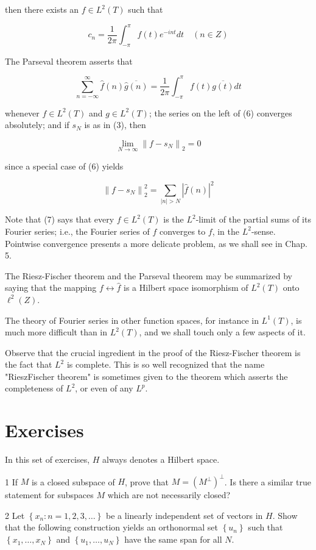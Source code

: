\documentclass[10pt]{article}
\begin{document}
then there exists an $f \in L^{2}(T)$ such that

$$
c_{n}=\frac{1}{2 \pi} \int_{-\pi}^{\pi} f(t) e^{-i n t} d t \quad(n \in Z)
$$

The Parseval theorem asserts that

$$
\sum_{n=-\infty}^{\infty} \hat{f}(n) \overline{\hat{g}(n)}=\frac{1}{2 \pi} \int_{-\pi}^{\pi} f(t) \overline{g(t)} d t
$$

whenever $f \in L^{2}(T)$ and $g \in L^{2}(T)$; the series on the left of (6) converges absolutely; and if $s_{N}$ is as in (3), then

$$
\lim _{N \rightarrow \infty}\left\|f-s_{N}\right\|_{2}=0
$$

since a special case of (6) yields

$$
\left\|f-s_{N}\right\|_{2}^{2}=\sum_{|n|>N}|\hat{f}(n)|^{2}
$$

Note that (7) says that every $f \in L^{2}(T)$ is the $L^{2}$-limit of the partial sums of its Fourier series; i.e., the Fourier series of $f$ converges to $f$, in the $L^{2}$-sense. Pointwise convergence presents a more delicate problem, as we shall see in Chap. 5.

The Riesz-Fischer theorem and the Parseval theorem may be summarized by saying that the mapping $f \leftrightarrow \hat{f}$ is a Hilbert space isomorphism of $L^{2}(T)$ onto $\ell^{2}(Z)$.

The theory of Fourier series in other function spaces, for instance in $L^{1}(T)$, is much more difficult than in $L^{2}(T)$, and we shall touch only a few aspects of it.

Observe that the crucial ingredient in the proof of the Riesz-Fischer theorem is the fact that $L^{2}$ is complete. This is so well recognized that the name "RieszFischer theorem" is sometimes given to the theorem which asserts the completeness of $L^{2}$, or even of any $L^{p}$.

\section{Exercises}
In this set of exercises, $H$ always denotes a Hilbert space.

1 If $M$ is a closed subspace of $H$, prove that $M=\left(M^{\perp}\right)^{\perp}$. Is there a similar true statement for subspaces $M$ which are not necessarily closed?

2 Let $\left\{x_{n}: n=1,2,3, \ldots\right\}$ be a linearly independent set of vectors in $H$. Show that the following construction yields an orthonormal set $\left\{u_{n}\right\}$ such that $\left\{x_{1}, \ldots, x_{N}\right\}$ and $\left\{u_{1}, \ldots, u_{N}\right\}$ have the same span for all $N$.
\end{document}
